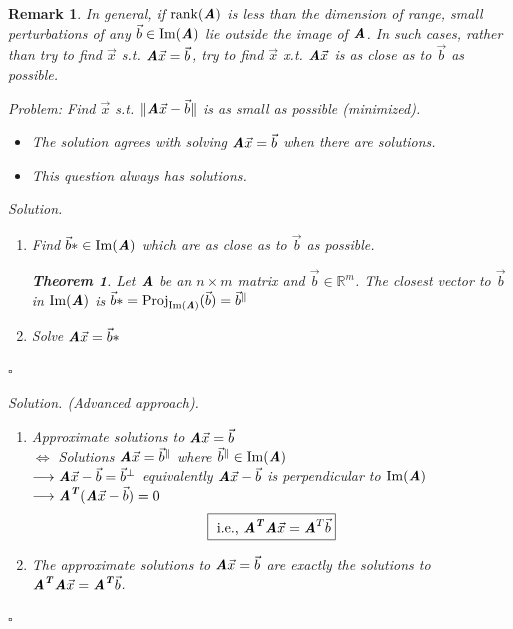 \documentclass[12pt, a4paper]{article}
\newtheorem{thm}{Theorem}[subsection]
\newenvironment*{sol}{\indent\textit{Solution. }}{\hfill{$\square$}\par}
\newtheorem*{rmk}{\indent Remark}
\def\R{{\mathbb{R}}}
\def\T{{\textbf{\emph{T}}}}
\def\IM{{\mathrm{Im}}}
\def\rank{\mathrm{rank}}
\def\Proj{\mathrm{Proj}}
\def\vecx{\vec{x}}
\def\vecb{\vec{b}}
\def\matrixA{\textbf{\emph{A}}}
\begin{document}
\begin{rmk}
	In general, if $\rank(\matrixA)$ is less than the dimension of range, small perturbations of any $\vecb\in\IM(\matrixA)$ lie outside the image of $\matrixA$. In such cases, rather than try to find $\vecx$ \emph{s.t.} $\matrixA\vecx=\vecb$, try to find $\vecx$ \emph{x.t.} $\matrixA\vecx$ is as close as to $\vecb$ as possible. 	
	\begin{tcolorbox}
		Problem: Find $\vecx$ \emph{s.t.} $\|\matrixA\vecx-\vecb\|$ is as small as possible (minimized).
		\begin{itemize}
			\item The solution agrees with solving $\matrixA\vecx=\vecb$ when there are solutions.
			\item This question always has solutions.
		\end{itemize}	
	\end{tcolorbox}
	\begin{sol}
		\begin{enumerate}
			\item Find $\vecb*\in\IM(\matrixA)$ which are as close as to $\vecb$ as possible. \\
			\begin{thm} Let $\matrixA$ be an $n\times m$ matrix and $\vecb\in\R^m$. The closest vector to $\vecb$ in $\IM(\matrixA)$ is $\vecb*=\Proj_{\IM(\matrixA)}(\vecb)=\vecb^\parallel$ \end{thm}
			\item Solve $\matrixA\vecx=\vecb*$
		\end{enumerate}
	\end{sol}
	\begin{sol}(Advanced approach).
		\begin{enumerate}
			\item Approximate solutions to 	$\matrixA\vecx=\vecb$\\$\Longleftrightarrow$ Solutions $\matrixA\vecx=\vecb^\parallel$ where $\vecb^\parallel\in\IM(\matrixA)$\\$\longrightarrow\matrixA\vecx-\vecb=\vecb^\perp$ equivalently $\matrixA\vecx-\vecb$ is perpendicular to $\IM(\matrixA)$\\$\longrightarrow\matrixA^\T(\matrixA\vecx-\vecb)=0$\[\boxed{\text{ i.e., }\matrixA^\T\matrixA\vecx=\matrixA^T\vecb}\]
			\item The approximate solutions to $\matrixA\vecx=\vecb$ are exactly the solutions to $\matrixA^\T\matrixA\vecx=\matrixA^\T\vecb$.
		\end{enumerate}
	\end{sol}

\end{rmk}
\end{document}

